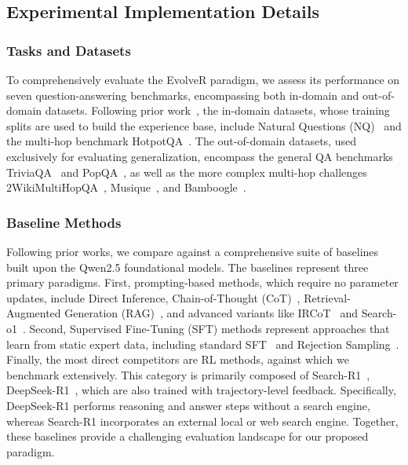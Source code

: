 \subsection{Experimental Implementation Details}
\label{sec:appdix_setup}

\subsubsection{Tasks and Datasets}
To comprehensively evaluate the EvolveR paradigm, we assess its performance on seven question-answering benchmarks, encompassing both in-domain and out-of-domain datasets. Following prior work~\citep{jin2025searchr1trainingllmsreason, mei2025o2searchersearchingbasedagentmodel}, the in-domain datasets, whose training splits are used to build the experience base, include Natural Questions (NQ)~\citep{kwiatkowski2019natural} and the multi-hop benchmark HotpotQA~\citep{yang2018hotpotqa}. The out-of-domain datasets, used exclusively for evaluating generalization, encompass the general QA benchmarks TriviaQA~\citep{joshi2017triviaqa} and PopQA~\citep{mallen2022not}, as well as the more complex multi-hop challenges 2WikiMultiHopQA~\citep{ho2020constructing}, Musique~\citep{trivedi2022musique}, and Bamboogle~\citep{press2022measuring}.


\subsubsection{Baseline Methods}
Following prior works, we compare against a comprehensive suite of baselines built upon the Qwen2.5 foundational models. The baselines represent three primary paradigms. First, prompting-based methods, which require no parameter updates, include Direct Inference, Chain-of-Thought (CoT)~\citep{wei2022chain}, Retrieval-Augmented Generation (RAG)~\citep{lewis2020retrieval}, and advanced variants like IRCoT~\citep{trivedi2022interleaving} and Search-o1~\citep{li2025search}. Second, Supervised Fine-Tuning (SFT) methods represent approaches that learn from static expert data, including standard SFT~\citep{chung2024scaling} and Rejection Sampling~\citep{ahn2024large}. Finally, the most direct competitors are RL methods, against which we benchmark extensively. This category is primarily composed of Search-R1~\citep{jin2025searchr1trainingllmsreason}, DeepSeek-R1~\citep{guo2025deepseek}, which are also trained with trajectory-level feedback. Specifically, DeepSeek-R1 performs reasoning and answer steps without a search engine, whereas Search-R1 incorporates an external local or web search engine. Together, these baselines provide a challenging evaluation landscape for our proposed paradigm.


